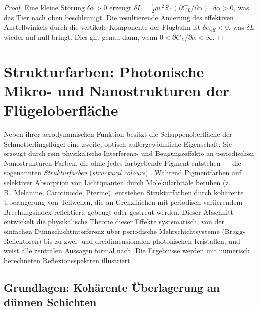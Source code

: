 ﻿\documentclass[a4paper,12pt]{article}
\theoremstyle{definition}
\begin{document}
	\begin{proof}
		Eine kleine Störung $\delta\alpha > 0$ erzeugt $\delta L = \frac{1}{2}\rho v^2 S
		\cdot (\partial C_L/\partial \alpha) \cdot \delta\alpha > 0$, was das Tier nach
		oben beschleunigt.
		Die resultierende Änderung des effektiven Anstellwinkels durch die vertikale
		Komponente der Flugbahn ist $\delta\alpha_\mathrm{eff} < 0$, was $\delta L$
		wieder auf null bringt.
		Dies gilt genau dann, wenn $0 < \partial C_L/\partial\alpha < \infty$.
	\end{proof}
	
\section{Strukturfarben: Photonische Mikro- und Nanostrukturen der Flügeloberfläche}
\label{sec:strukturfarben}

Neben ihrer aerodynamischen Funktion besitzt die Schuppenoberfläche der
Schmetterlingsflügel eine zweite, optisch außergewöhnliche Eigenschaft:
Sie erzeugt durch rein physikalische Interferenz- und Beugungseffekte an
periodischen Nanostrukturen Farben, die ohne jedes farbgebende Pigment
entstehen --- die sogenannten \emph{Strukturfarben}
(\textit{structural colours}) \cite{vukusic2003photonic}.
Während Pigmentfarben auf selektiver Absorption von Lichtquanten durch
Molekülorbitale beruhen (z.\,B.\ Melanine, Carotinoide, Pterine), entstehen
Strukturfarben durch kohärente Überlagerung von Teilwellen, die an
Grenzflächen mit periodisch variierendem Brechungsindex reflektiert,
gebeugt oder gestreut werden.
Dieser Abschnitt entwickelt die physikalische Theorie dieser Effekte
systematisch, von der einfachen Dünnschichtinterferenz über
periodische Mehrschichtsysteme (Bragg-Reflektoren) bis zu
zwei- und dreidimensionalen photonischen Kristallen, und weist alle
zentralen Aussagen formal nach.
Die Ergebnisse werden mit numerisch berechneten Reflexionsspektren
illustriert.

\subsection{Grundlagen: Kohärente Überlagerung an dünnen Schichten}
\label{sec:duennschicht}
\end{document}
